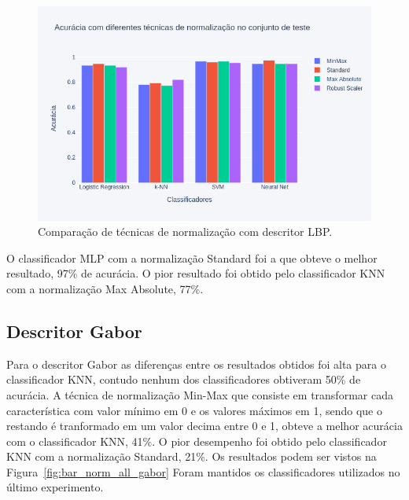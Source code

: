 \documentclass[a4paper, 12 pt, conference]{ieeeconf}  %
\begin{document}
\begin{figure}[!htbp]
	\centering
	\includegraphics[width=1.0\linewidth,clip=true,trim=0cm 0cm 0cm 0cm, keepaspectratio=true]{bar_norm_all_lbp.png}
	\caption{Comparação de técnicas de normalização com descritor LBP.}
	\label{fig:bar_norm_all_lbp}
\end{figure}

O classificador MLP com a normalização Standard foi a que obteve o melhor resultado, 97\% de acurácia. O pior resultado foi obtido pelo classificador KNN com a normalização Max Absolute, 77\%.

\subsection{Descritor Gabor}
Para o descritor Gabor as diferenças entre os resultados obtidos foi alta para o classificador KNN, contudo nenhum dos classificadores obtiveram 50\% de acurácia. A técnica de normalização Min-Max que consiste em transformar cada característica com valor mínimo em 0 e os valores máximos em 1, sendo que o restando é tranformado em um valor decima entre 0 e 1, obteve a melhor acurácia com o classificador KNN, 41\%. O pior desempenho foi obtido pelo classificador KNN com a normalização Standard, 21\%. Os resultados podem ser vistos na Figura~\ref{fig:bar_norm_all_gabor} Foram mantidos os classificadores utilizados no último experimento.
\end{document}
